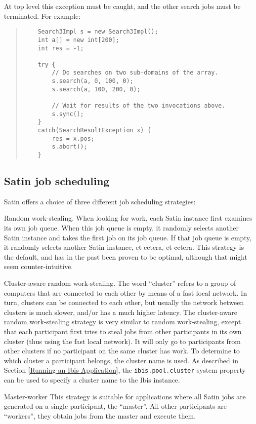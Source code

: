 \documentclass[10pt]{article}
\newcommand{\mysubsection}[1]{\subsection{#1}\label{#1}}
\begin{document}
At top level this exception must be caught, and the other search
jobs must be terminated. For example:

\begin{quote}
\begin{verbatim}
    Search3Impl s = new Search3Impl();
    int a[] = new int[200];
    int res = -1;

    try {
        // Do searches on two sub-domains of the array.
        s.search(a, 0, 100, 0);
        s.search(a, 100, 200, 0);

        // Wait for results of the two invocations above.
        s.sync();
    }
    catch(SearchResultException x) {
        res = x.pos;
        s.abort();
    }
\end{verbatim}
\end{quote}

\mysubsection{Satin job scheduling}

Satin offers a choice of three different job scheduling strategies:
\begin{description}
\item{Random work-stealing}.
When looking for work, each Satin instance
first examines its own job queue. When this job queue is empty,
it randomly selects another Satin instance and takes the first job on its job queue.
If that job queue is empty, it randomly selects another Satin instance, et cetera,
et cetera.  This strategy is the default, and has in the past been proven
to be optimal, although that might seem counter-intuitive.

\item{Cluster-aware random work-stealing}.
The word ``cluster'' refers to a group of computers that are connected
to each other by means of a fast local network.
In turn, clusters can be connected to each other, but usually the
network between clusters is much slower, and/or has a much higher latency.
The cluster-aware random work-stealing strategy
is very similar to random work-stealing, except that
each participant first tries to steal jobs from other participants in its
own cluster (thus using the fast local network).
It will only go to participants from other clusters if no participant on the
same cluster has work.
To determine to which cluster a participant belongs, the cluster name
is used.
As described in Section \ref{Running an Ibis Application},
the \texttt{ibis.pool.cluster} system property can be used to
specify a cluster name to the Ibis instance.

\item{Master-worker}
This strategy is suitable for applications where all Satin jobs are
generated on a single participant, the ``master''. All other participants
are ``workers'', they obtain jobs from the master and execute them.
\end{description}
\end{document}
